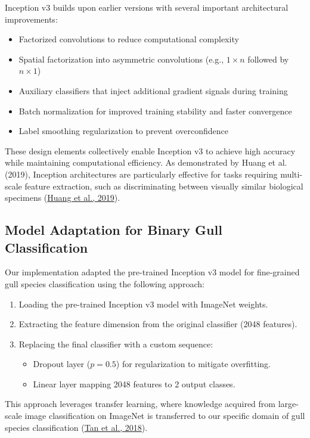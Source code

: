 \documentclass[a4paper,12pt]{article}
\begin{document}
Inception v3 builds upon earlier versions with several important architectural improvements:
\begin{itemize}
    \item Factorized convolutions to reduce computational complexity
    \item Spatial factorization into asymmetric convolutions (e.g., $1 \times n$ followed by $n \times 1$)
    \item Auxiliary classifiers that inject additional gradient signals during training
    \item Batch normalization for improved training stability and faster convergence
    \item Label smoothing regularization to prevent overconfidence
\end{itemize}

These design elements collectively enable Inception v3 to achieve high accuracy while maintaining computational efficiency. As demonstrated by Huang et al. (2019), Inception architectures are particularly effective for tasks requiring multi-scale feature extraction, such as discriminating between visually similar biological specimens (\href{https://ieeexplore.ieee.org/document/8803812}{Huang et al., 2019}).

\subsection*{Model Adaptation for Binary Gull Classification}
Our implementation adapted the pre-trained Inception v3 model for fine-grained gull species classification using the following approach:
\begin{enumerate}
    \item Loading the pre-trained Inception v3 model with ImageNet weights.
    \item Extracting the feature dimension from the original classifier (2048 features).
    \item Replacing the final classifier with a custom sequence:
    \begin{itemize}
        \item Dropout layer ($p=0.5$) for regularization to mitigate overfitting.
        \item Linear layer mapping 2048 features to 2 output classes.
    \end{itemize}
\end{enumerate}

This approach leverages transfer learning, where knowledge acquired from large-scale image classification on ImageNet is transferred to our specific domain of gull species classification (\href{https://arxiv.org/abs/1805.08974}{Tan et al., 2018}).
\end{document}

